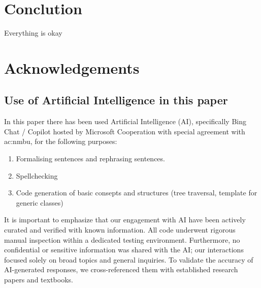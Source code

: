 \section{Conclution}

Everything is okay
\section{Acknowledgements}
\subsection[Use of AI]{Use of Artificial Intelligence in this paper}

In this paper there has been used Artificial Intelligence (AI), specifically Bing Chat / Copilot hosted by Microsoft Cooperation with special agreement with \acrfull{ac:nmbu}, for the following purposes:

\begin{enumerate}
	\item Formalising sentences and rephrasing sentences.
	\item Spellchecking
	\item Code generation of basic consepts and structures (tree traversal, template for generic classes) 
\end{enumerate}

It is important to emphasize that our engagement with AI have been actively curated and verified with known information. All code underwent rigorous manual inspection within a dedicated testing environment. Furthermore, no confidential or sensitive information was shared with the AI; our interactions focused solely on broad topics and general inquiries. To validate the accuracy of AI-generated responses, we cross-referenced them with established research papers and textbooks.
\label{pg:LastBread}